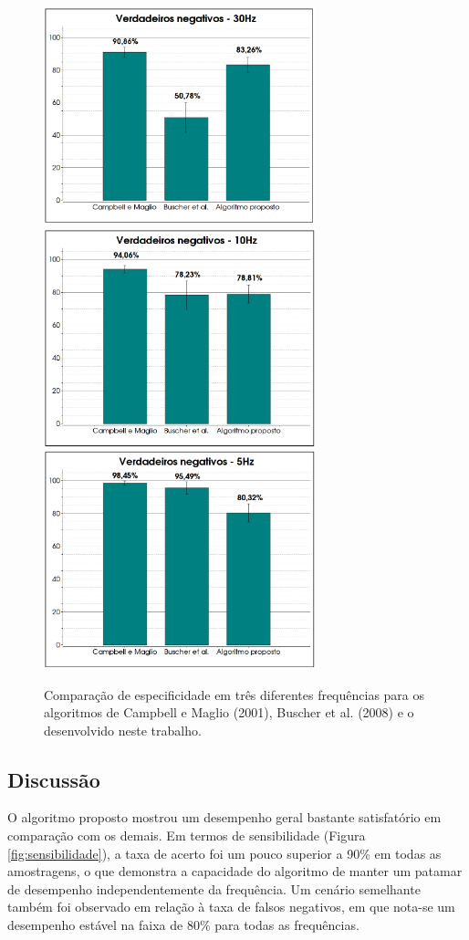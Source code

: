 \documentclass[12pt]{article}
\begin{document}
		\begin{figure}[!ht]
			\centering
			\includegraphics[width=7.85cm]{imgs/Graph4.png}
			\includegraphics[width=7.85cm]{imgs/Graph5.png}
			\includegraphics[width=7.85cm]{imgs/Graph6.png}
			\caption{\footnotesize {Comparação de especificidade em três diferentes frequências para os algoritmos de Campbell e Maglio (2001), Buscher et al. (2008) e o desenvolvido neste trabalho.}}
			\label{fig:especificidade}
			\vspace{5mm}
		\end{figure}
		
		\subsection{Discussão}
		O algoritmo proposto mostrou um desempenho geral bastante satisfatório em comparação com os demais. Em termos de sensibilidade (Figura \ref{fig:sensibilidade}), a taxa de acerto foi um pouco superior a 90\% em todas as amostragens, o que demonstra a capacidade do algoritmo de manter um patamar de desempenho independentemente da frequência. Um cenário semelhante também foi observado em relação à taxa de falsos negativos, em que nota-se um desempenho estável na faixa de 80\% para todas as frequências.
		
\end{document}
